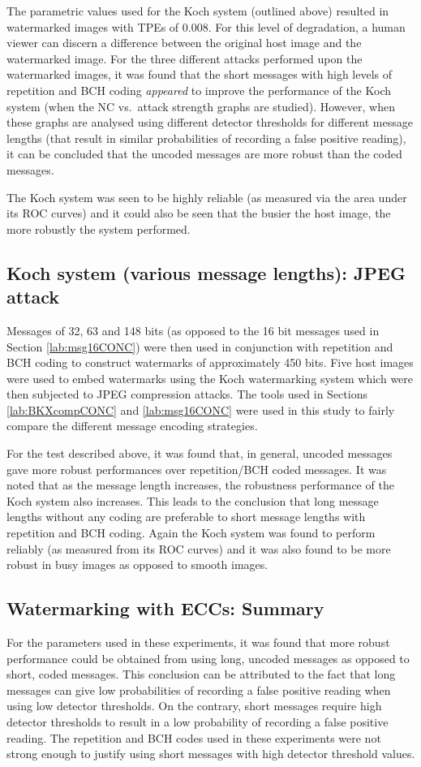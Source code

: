 \documentclass[12pt]{report}
\begin{document}
The parametric values used for the Koch system (outlined above) resulted in watermarked images with 
TPEs of 0.008.
For this level of degradation, a human
viewer can discern a difference between the original host image and the watermarked image. 
For the three different attacks performed upon the watermarked images, it was found that the short
messages with high levels of repetition and BCH coding \emph{appeared} to improve the performance 
of the Koch system (when the NC vs.~attack strength graphs are studied). However, when these
graphs are analysed using different detector thresholds for different message lengths (that 
result in similar probabilities of recording a false positive reading), it can be concluded that 
the uncoded messages are more robust than the coded messages.

The Koch system was seen to be highly reliable (as measured via the area under its ROC curves) and
it could also be seen that the busier the host image, the more robustly the system performed.

\subsection{Koch system (various message lengths): JPEG attack}
	\label{lab:msgDiffCONC}
	Messages of 32, 63 and 148 bits (as opposed to the 16 bit messages used in Section \ref{lab:msg16CONC}) 
	were then used in conjunction with repetition and BCH coding to 
	construct watermarks of approximately 450 bits. Five host images were used to embed watermarks
	using the Koch watermarking system 
	which were then subjected to JPEG compression attacks.
	The tools used in Sections \ref{lab:BKXcompCONC} and \ref{lab:msg16CONC} were used in this study to 
	fairly compare the different message encoding strategies.
	
For the test described above, it was found that, in general, uncoded messages
gave more robust performances over repetition/BCH coded messages. It was noted that as the message length
increases, the robustness performance of the Koch system also increases. This leads to the
conclusion that long message lengths without any coding are preferable to short message lengths with repetition 
and BCH coding. Again the Koch system was found to perform reliably (as measured from its ROC curves) and it was also 
found to be more robust in busy images as opposed to smooth images.

\subsection{Watermarking with ECCs: Summary}
For the parameters used in these experiments, it was found that more robust performance could
be obtained from using long, uncoded messages as opposed to short, coded messages. This conclusion
can be attributed to the fact that long messages can give low probabilities of recording a 
false positive reading when using low detector thresholds. On the contrary, short messages
require high detector thresholds to result in a low probability of recording a 
false positive reading. The repetition and BCH codes used in these experiments were not 
strong enough to justify using short messages with high detector threshold values. 
\end{document}
